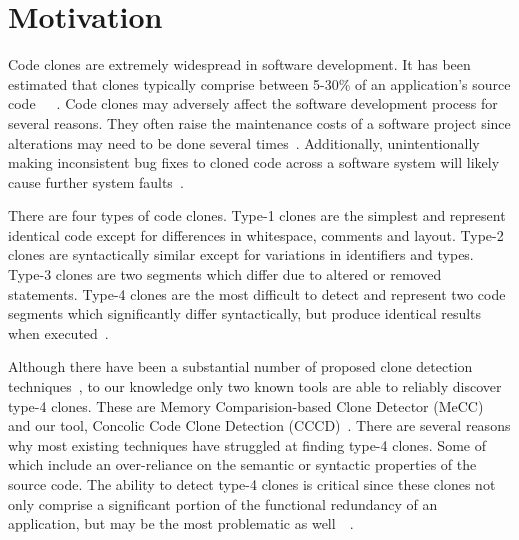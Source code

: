 \documentclass{article}
\begin{document}
\maketitle


\section{Motivation}




Code clones are extremely widespread in software development. It has been estimated that clones typically comprise between 5-30\% of an application's source code~\cite{Baxter:1998:CDU:850947.853341}~\cite{Schulze:2010:CCF:1942788.1868310}~\cite{Kim:2005:ESC:1095430.1081737}. Code clones may adversely affect the software development process for several reasons. They often raise the maintenance costs of a software project since alterations may need to be done several times~\cite{Juergens:2009:CCM:1555001.1555062}. Additionally, unintentionally making inconsistent bug fixes to cloned code across a software system will likely cause further system faults~\cite{Deissenboeck_2010}. 

There are four types of code clones. Type-1 clones are the simplest and represent identical code except for differences in whitespace, comments and layout. Type-2 clones are syntactically similar except for variations in identifiers and types. Type-3 clones are two segments which differ due to altered or removed statements. Type-4 clones are the most difficult to detect and represent two code segments which significantly differ syntactically, but produce identical results when executed~\cite{Gold:2010:ICC:1808901.1808916}. 

Although there have been a substantial number of proposed clone detection techniques~\cite{Roy07asurvey}, to our knowledge only two known tools are able to reliably discover type-4 clones. These are Memory Comparision-based Clone Detector (MeCC)~\cite{Kim:2011:MMC:1985793.1985835} and our tool, Concolic Code Clone Detection (CCCD)~\cite{wcre2013}. There are several reasons why most existing techniques have struggled at finding type-4 clones. Some of which include an over-reliance on the semantic or syntactic properties of the source code. The ability to detect type-4 clones is critical since these clones not only comprise a significant portion of the functional redundancy of an application, but may be the most problematic as well~\cite{Roy:2009:CEC:1530898.1531101}~\cite{Yuan:2011:CCM:2114489.2114766}. 
\end{document}
